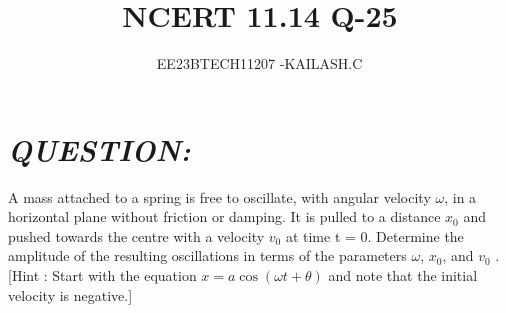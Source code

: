 \documentclass[journal,12pt,twocolumn]{IEEEtran}
\theoremstyle{remark}
\begin{document}

\vspace{3cm}

\title{NCERT 11.14 Q-25}
\author{EE23BTECH11207 -KAILASH.C$^{}$%
}
\maketitle
\newpage
\bigskip

\renewcommand{\thefigure}{\theenumi}
\renewcommand{\thetable}{\theenumi}
\section{\textit{QUESTION:}}
\Large
{A mass attached to a spring is free to oscillate, with angular velocity $\omega$, in a horizontal
plane without friction or damping. It is pulled to a distance $x_0$
 and pushed towards
the centre with a velocity $v_0$
 at time t = 0. Determine the amplitude of the resulting
oscillations in terms of the parameters $\omega{}$, $x_0$,
 and $v_0$
. [Hint : Start with the equation
$x = a \cos(\omega{t}+\theta{})$ and note that the initial velocity is negative.]}
\end{document}
